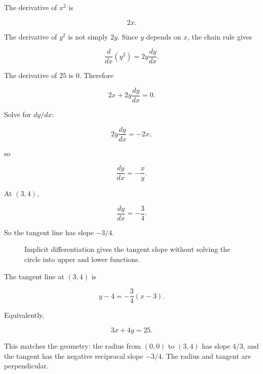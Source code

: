 The derivative of \(x^2\) is

\[
2x.
\]

The derivative of \(y^2\) is not simply \(2y\).  Since \(y\) depends on \(x\), the chain rule gives

\[
\frac{d}{dx}(y^2)=2y\frac{dy}{dx}.
\]

The derivative of \(25\) is \(0\).  Therefore

\[
2x+2y\frac{dy}{dx}=0.
\]

Solve for \(dy/dx\):

\[
2y\frac{dy}{dx}=-2x,
\]

so

\[
\boxed{
\frac{dy}{dx}=-\frac{x}{y}.
}
\]

At \((3,4)\),

\[
\frac{dy}{dx}
=
-\frac34.
\]

So the tangent line has slope \(-3/4\).

\begin{figure}[h]
\centering
{}
\caption{Implicit differentiation gives the tangent slope without solving the circle into upper and lower functions.}
\label{fig:circle-implicit-tangent}
\end{figure}

The tangent line at \((3,4)\) is

\[
y-4=-\frac34(x-3).
\]

Equivalently,

\[
3x+4y=25.
\]

This matches the geometry: the radius from \((0,0)\) to \((3,4)\) has slope \(4/3\), and the tangent has the negative reciprocal slope \(-3/4\).  The radius and tangent are perpendicular.

